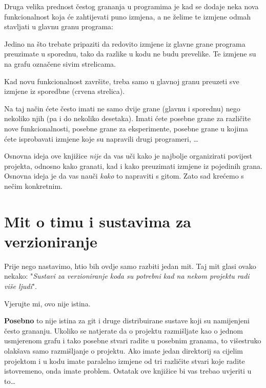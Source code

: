 Druga velika prednost čestog grananja u programima je kad se dodaje neka nova funkcionalnost koja će zahtijevati puno izmjena, a ne želime te izmjene odmah stavljati u glavnu granu programa:



Jedino na što trebate pripaziti da redovito izmjene iz glavne grane programa preuzimate u sporednu, tako da razlike u kodu ne budu prevelike. 
Te izmjene su na grafu označene sivim strelicama.

Kad novu funkcionalnost završite, treba samo u glavnoj granu preuzeti sve izmjene iz sporedbne (crvena strelica).

Na taj način ćete često imati ne samo dvije grane (glavnu i sporednu) nego nekoliko njih (pa i do nekoliko desetaka). 
Imati ćete posebne grane za različite nove funkcionalnosti, posebne grane za eksperimente, posebne grane u kojima ćete isprobavati izmjene koje su napravili drugi programeri, \dots

Osnovna ideja ove knjižice \emph{nije} da vas uči kako je najbolje organizirati povijest projekta, odnosno kako granati, kad i kako preuzimati izmjene iz pojedinih grana. Osnovna ideja je da vas nauči \emph{kako} to napraviti s gitom. Zato sad krećemo s nečim konkretnim.

\section*{Mit o timu i sustavima za verzioniranje}

Prije nego nastavimo, htio bih ovdje samo razbiti jedan mit. 
Taj mit glasi ovako nekako: "\emph{Sustavi za verzioniranje koda su potrebni kad na nekom projektu radi više ljudi}".

Vjerujte mi, ovo nije istina.

\textbf{Posebno} to nije istina za git i druge distribuirane sustave koji su namijenjeni često grananju.
Ukoliko se natjerate da o projektu razmišljate kao o jednom usmjerenom grafu i tako posebne stvari radite u posebnim granama, to višestruko olakšava samo razmišljanje o projektu.
Ako imate jedan direktorij sa cijelim projektom i u kodu imate paralelno izmjene od tri različite stvari koje radite istovremeno, onda imate problem.
Ostatak ove knjižice bi vas trebao uvjeriti u to\dots

